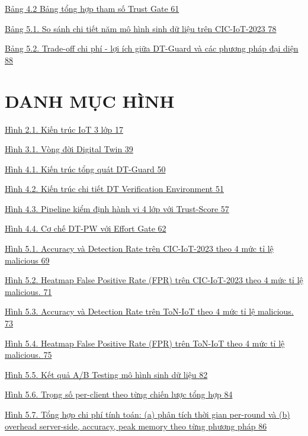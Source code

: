 \hyperref[_Toc228033025]{Bảng 4.2 Bảng tổng hợp tham số Trust Gate \hyperref[_Toc228033025]{61}}

\hyperref[_Toc228034267]{Bảng 5.1. So sánh chi tiết năm mô hình sinh dữ liệu trên CIC-IoT-2023 \hyperref[_Toc228034267]{78}}

\hyperref[_Toc228034268]{Bảng 5.2. Trade-off chi phí - lợi ích giữa DT-Guard và các phương pháp đại diện \hyperref[_Toc228034268]{88}}

\section{DANH MỤC HÌNH}\label{danh-mux1ee5c-huxecnh}

\hyperref[_Toc228106951]{Hình 2.1. Kiến trúc IoT 3 lớp \hyperref[_Toc228106951]{17}}

\hyperref[_Toc228106952]{Hình 3.1. Vòng đời Digital Twin \hyperref[_Toc228106952]{39}}

\hyperref[_Toc228106953]{Hình 4.1. Kiến trúc tổng quát DT-Guard \hyperref[_Toc228106953]{50}}

\hyperref[_Toc228107377]{Hình 4.2. Kiến trúc chi tiết DT Verification Environment \hyperref[_Toc228107377]{51}}

\hyperref[_Toc228106955]{Hình 4.3. Pipeline kiểm định hành vi 4 lớp với Trust-Score \hyperref[_Toc228106955]{57}}

\hyperref[_Toc228106956]{Hình 4.4. Cơ chế DT-PW với Effort Gate \hyperref[_Toc228106956]{62}}

\hyperref[_Toc228106957]{Hình 5.1. Accuracy và Detection Rate trên CIC-IoT-2023 theo 4 mức tỉ lệ malicious \hyperref[_Toc228106957]{69}}

\hyperref[_Toc228106958]{Hình 5.2. Heatmap False Positive Rate (FPR) trên CIC-IoT-2023 theo 4 mức tỉ lệ malicious. \hyperref[_Toc228106958]{71}}

\hyperref[_Toc228107383]{Hình 5.3. Accuracy và Detection Rate trên ToN-IoT theo 4 mức tỉ lệ malicious. \hyperref[_Toc228107383]{73}}

\hyperref[_Toc228106960]{Hình 5.4. Heatmap False Positive Rate (FPR) trên ToN-IoT theo 4 mức tỉ lệ malicious. \hyperref[_Toc228106960]{75}}

\hyperref[_Toc228106961]{Hình 5.5. Kết quả A/B Testing mô hình sinh dữ liệu \hyperref[_Toc228106961]{82}}

\hyperref[_Toc228107206]{Hình 5.6. Trọng số per-client theo từng chiến lược tổng hợp \hyperref[_Toc228107206]{84}}

\hyperref[_Toc228106963]{Hình 5.7. Tổng hợp chi phí tính toán: (a) phân tích thời gian per-round và (b) overhead server-side, accuracy, peak memory theo từng phương pháp \hyperref[_Toc228106963]{86}}


